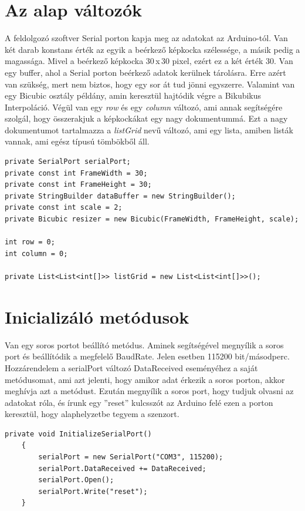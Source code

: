 \documentclass[]{thesis-ekf}
\theoremstyle{definition}
\theoremstyle{remark}
\begin{document}
\section{Az alap változók}
A feldolgozó szoftver Serial porton kapja meg az adatokat az Arduino-tól. Van két darab konstans érték az egyik a beérkező képkocka szélessége, a másik pedig a magassága. Mivel a beérkező képkocka 30\,x\,30 pixel, ezért ez a két érték 30. Van egy buffer, ahol a Serial porton beérkező adatok kerülnek tárolásra. Erre azért van szükség, mert nem biztos, hogy egy sor át tud jönni egyszerre. Valamint van egy Bicubic osztály példány, amin keresztül hajtódik végre a Bikubikus Interpoláció. Végül van egy \emph{row} és egy \emph{column} változó, ami annak segítségére szolgál, hogy összerakjuk a képkockákat egy nagy dokumentummá. Ezt a nagy dokumentumot tartalmazza a \emph{listGrid} nevű változó, ami egy lista, amiben listák vannak, ami egész típusú tömbökből áll. 
\begin{lstlisting}[language=CSharp]
private SerialPort serialPort;
private const int FrameWidth = 30; 
private const int FrameHeight = 30; 
private StringBuilder dataBuffer = new StringBuilder(); 
private const int scale = 2;
private Bicubic resizer = new Bicubic(FrameWidth, FrameHeight, scale);

int row = 0;
int column = 0;

private List<List<int[]>> listGrid = new List<List<int[]>>();
\end{lstlisting}

\section{Inicializáló metódusok}
Van egy soros portot beállító metódus. Aminek segítségével megnyílik a soros port és beállítódik a megfelelő BaudRate. Jelen esetben 115200 bit/másodperc. Hozzárendelem a serialPort változó DataReceived eseményéhez a saját metódusomat, ami azt jelenti, hogy amikor adat érkezik a soros porton, akkor meghívja azt a metódust. Ezután megnyílik a soros port, hogy tudjuk olvasni az adatokat róla, és írunk egy ''reset'' kulcsszót az Arduino felé ezen a porton keresztül, hogy alaphelyzetbe tegyem a szenzort.
\begin{lstlisting}[language=CSharp]
	private void InitializeSerialPort()
	{
		serialPort = new SerialPort("COM3", 115200);
		serialPort.DataReceived += DataReceived;
		serialPort.Open();
		serialPort.Write("reset");
	}
\end{lstlisting}
\end{document}
